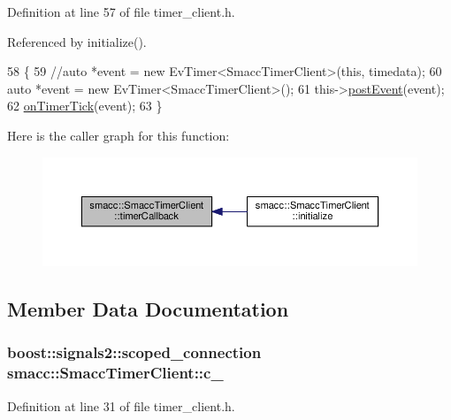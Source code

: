 Definition at line 57 of file timer\+\_\+client.\+h.



Referenced by initialize().


\begin{DoxyCode}
58     \{
59         \textcolor{comment}{//auto *event = new EvTimer<SmaccTimerClient>(this, timedata);}
60         \textcolor{keyword}{auto} *\textcolor{keyword}{event} = \textcolor{keyword}{new} EvTimer<SmaccTimerClient>();
61         this->\hyperlink{classsmacc_1_1ISmaccClient_a46cbc0d695214efe40d29247323bfc80}{postEvent}(event);
62         \hyperlink{classsmacc_1_1SmaccTimerClient_a956acd3689ff143d52066fddc884072f}{onTimerTick}(event);
63     \}
\end{DoxyCode}


Here is the caller graph for this function\+:
\nopagebreak
\begin{figure}[H]
\begin{center}
\leavevmode
\includegraphics[width=350pt]{classsmacc_1_1SmaccTimerClient_a1fbc0b2c0da3c912feb72d4318d4d143_icgraph}
\end{center}
\end{figure}




\subsection{Member Data Documentation}
\subsubsection[{\texorpdfstring{c\+\_\+}{c_}}]{\setlength{\rightskip}{0pt plus 5cm}boost\+::signals2\+::scoped\+\_\+connection smacc\+::\+Smacc\+Timer\+Client\+::c\+\_\+}\hypertarget{classsmacc_1_1SmaccTimerClient_ae86e47b05d8748ce801ef3fc2b4c69ed}{}\label{classsmacc_1_1SmaccTimerClient_ae86e47b05d8748ce801ef3fc2b4c69ed}


Definition at line 31 of file timer\+\_\+client.\+h.

